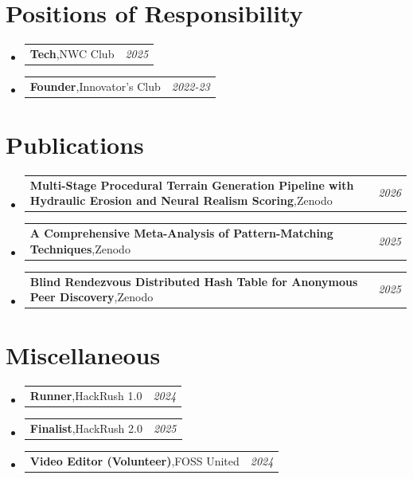 \documentclass[a4paper,11pt]{article}
\makeatletter
\newcommand{\resumePOR}[3]{
\vspace{0.5mm}\item
    \begin{tabular*}{0.97\textwidth}[t]{l@{\extracolsep{\fill}}r}
        \textbf{#1},\hspace{0.3mm}#2 & \textit{\small{#3}} 
    \end{tabular*}
    \vspace{-2mm}
}
\newcommand{\resumeSubHeadingListStart}{\begin{itemize}[leftmargin=*,labelsep=0mm]}
\newcommand{\resumeSubHeadingListEnd}{\end{itemize}\vspace{2mm}}
\makeatother
\begin{document}
\section{\textbf{Positions of Responsibility}}
\vspace{-0.4mm}
\resumeSubHeadingListStart
  \resumePOR{Tech} %
    {NWC Club} %
    {2025} %
  \resumePOR{Founder} %
    {Innovator's Club} %
    {2022-23} %
\resumeSubHeadingListEnd
\vspace{-4mm}

\section{\textbf{Publications}}
\vspace{-0.4mm}
\resumeSubHeadingListStart
  \resumePOR{Multi-Stage Procedural Terrain Generation Pipeline with Hydraulic Erosion and Neural Realism Scoring}
  {Zenodo}
  {2026}
  \resumePOR{A Comprehensive Meta-Analysis of Pattern-Matching Techniques}
  {Zenodo}
  {2025}
  \resumePOR{Blind Rendezvous Distributed Hash Table for Anonymous Peer Discovery}
  {Zenodo}
  {2025}
\resumeSubHeadingListEnd
\vspace{-4mm}
\section{\textbf{Miscellaneous}}
\vspace{-0.1mm}
\resumeSubHeadingListStart
\resumePOR{Runner} %
    {HackRush  1.0} %
    {2024} %
\vspace{-0.1mm}
\resumePOR{Finalist} %
    {HackRush 2.0} %
    {2025} %
\vspace{-0.1mm}
\resumePOR{Video Editor (Volunteer)}
{FOSS United}
{2024}
\resumeSubHeadingListEnd
\vfill
{}
\end{document}
